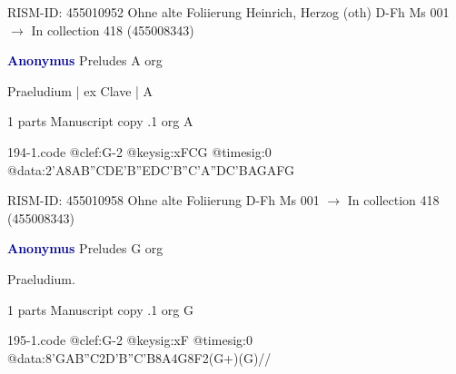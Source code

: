 \documentclass[twocolumn]{book}
\begin{document}
\newline RISM-ID: 455010952
\newline Ohne alte Foliierung
\newline Heinrich, Herzog  (oth)
\newline D-Fh  Ms 001
\newline $\rightarrow$ In collection 418 (455008343)

\newline \par \vspace{7pt} \textcolor{darkblue}{\textbf{Anonymus  }}
\newline Preludes  A  
\newline org
\newline \begin{itshape}[f.81r, at left:] Praeludium | ex Clave | A\end{itshape} 
\newline \textcolor{darkblue}{}  1 parts  
\newline Manuscript copy
.1  org  A  
\begin{filecontents*}{194-1.code}
@clef:G-2
@keysig:xFCG
@timesig:0
@data:2'A{8AB''CD}{E'B''ED}{C'B''C'A}{''DC'BA}{GAFG}
\end{filecontents*}
\newline
%

\newline RISM-ID: 455010958
\newline Ohne alte Foliierung
\newline D-Fh  Ms 001
\newline $\rightarrow$ In collection 418 (455008343)

\newline \par \vspace{7pt} \textcolor{darkblue}{\textbf{Anonymus  }}
\newline Preludes  G  
\newline org
\newline \begin{itshape}[f.81v, at left:] Praeludium.\end{itshape} 
\newline \textcolor{darkblue}{}  1 parts  
\newline Manuscript copy
.1  org  G  
\begin{filecontents*}{195-1.code}
@clef:G-2
@keysig:xF
@timesig:0
@data:{8'GAB''C}2D'B''C'B8A4G8F2(G+)(G)//
\end{filecontents*}
\newline
%
\end{document}
